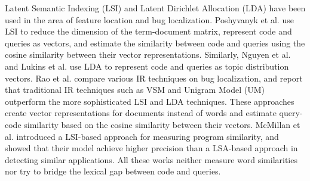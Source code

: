 Latent Semantic Indexing (LSI) and Latent Dirichlet Allocation (LDA) have been used in the area of feature location and bug localization. Poshyvanyk et al. \cite{Poshyvanyk:2007:FLU:1263152.1263534, Poshyvanyk:2006:CPR:1135772.1136177} use LSI to reduce the dimension of the term-document matrix, represent code and queries as vectors, and estimate the similarity between code and queries using the cosine similarity between their vector representations. Similarly, Nguyen et al. \cite{Nguyen:2011:TAN:2190078.2190181} and Lukins et al. \cite{Lukins:2010:BLU:1824820.1824850} use LDA to represent code and queries as topic distribution vectors. Rao et al. \cite{Rao:2011:RSL:1985441.1985451} compare various IR techniques on bug localization, and report that traditional IR techniques such as VSM and Unigram Model (UM) outperform the more sophisticated LSI and LDA techniques. These approaches create vector representations for documents instead of words and estimate query-code similarity based on the cosine similarity between their vectors. McMillan et al. \cite{McMillan:2012:DSS:2337223.2337267} introduced a LSI-based approach for measuring program similarity, and showed that their model achieve higher precision than a LSA-based approach \cite{1371919} in detecting similar applications. All these works neither measure word similarities nor try to bridge the lexical gap between code and queries.
